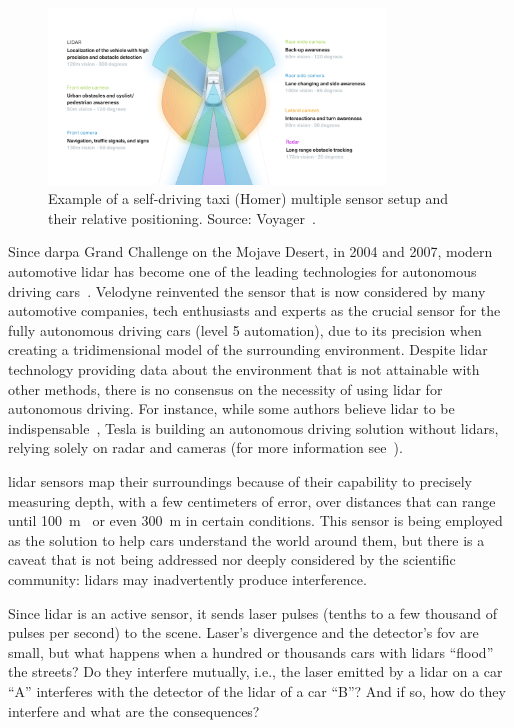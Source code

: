 \begin{figure}
	\centering
	\includegraphics[width=0.8\textwidth]{img/sensor_fusion/homer_setup.png}
	\caption[Example of a multiple sensor setup on an autonomous car.]{Example of a self-driving taxi (Homer) multiple sensor setup and their relative positioning. Source: Voyager~\cite{Cameron}.}
	\label{fig:introduction:homer-setup}
\end{figure}

Since \ac{darpa} Grand Challenge on the Mojave Desert, in 2004 and 2007, modern automotive \ac{lidar} has become one of the leading technologies for autonomous driving cars~\cite{Bezemek2017}. Velodyne reinvented the sensor that is now considered by many automotive companies, tech enthusiasts and experts as the crucial sensor for the fully autonomous driving cars (level 5 automation), due to its precision when creating a tridimensional  model of the surrounding environment. Despite \ac{lidar} technology providing data about the environment that is not attainable with other methods, there is no consensus on the necessity of using \ac{lidar} for autonomous driving. For instance, while some authors believe \ac{lidar} to be indispensable~\cite{Bimbraw2015, Hecht2018, Sullivan2016}, Tesla is building an autonomous driving solution without \acp{lidar}, relying solely on \ac{radar} and cameras (for more information see~\cite{Bimbraw2015, Hecht2018}).


\ac{lidar} sensors map their surroundings because of their capability to precisely measuring depth, with a few centimeters of error, over distances that can range until \SI{100}{\meter}~\cite{vlp16, Sullivan2016} or even \SI{300}{\meter} in certain conditions. This sensor is being employed as the solution to help cars understand the world around them, but there is a caveat that is not being addressed nor deeply considered by the scientific community: \acp{lidar} may inadvertently produce interference.

Since \ac{lidar} is an active sensor, it sends laser pulses (tenths to a few thousand of pulses per second) to the scene. Laser's divergence and the detector's \ac{fov} are small, but what happens when a hundred or thousands cars with \acp{lidar} ``flood'' the streets? Do they interfere mutually, i.e., the laser emitted by a \ac{lidar} on a car ``A'' interferes with the detector of the \ac{lidar} of a car ``B''? And if so, how do they interfere and what are the consequences? 

